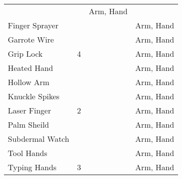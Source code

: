 \documentclass[twoside]{book}
\begin{document}
\begin{longtable}{p{1.25in}p{2em}ll}
  &
  
  &
   Arm, Hand 
  \tabularnewline
      
  \raggedright
           Finger Sprayer 
  &
  
  &
  
  &
   Arm, Hand 
  \tabularnewline
      
  \raggedright
           Garrote Wire 
  &
  
  &
  
  &
   Arm, Hand 
  \tabularnewline
      
  \raggedright
           Grip Lock 
  &
   4 
  &
  
  &
   Arm, Hand 
  \tabularnewline
      
  \raggedright
           Heated Hand 
  &
  
  &
  
  &
   Arm, Hand 
  \tabularnewline
      
  \raggedright
           Hollow Arm 
  &
  
  &
  
  &
   Arm, Hand 
  \tabularnewline
      
  \raggedright
           Knuckle Spikes 
  &
  
  &
  
  &
   Arm, Hand 
  \tabularnewline
      
  \raggedright
           Laser Finger 
  &
   2 
  &
  
  &
   Arm, Hand 
  \tabularnewline
      
  \raggedright
           Palm Sheild 
  &
  
  &
  
  &
   Arm, Hand 
  \tabularnewline
      
  \raggedright
           Subdermal Watch 
  &
  
  &
  
  &
   Arm, Hand 
  \tabularnewline
      
  \raggedright
           Tool Hands 
  &
  
  &
  
  &
   Arm, Hand 
  \tabularnewline
      
  \raggedright
           Typing Hands 
  &
   3 
  &
  
  &
   Arm, Hand 
  \tabularnewline
      
\end{longtable}
    
\end{document}
